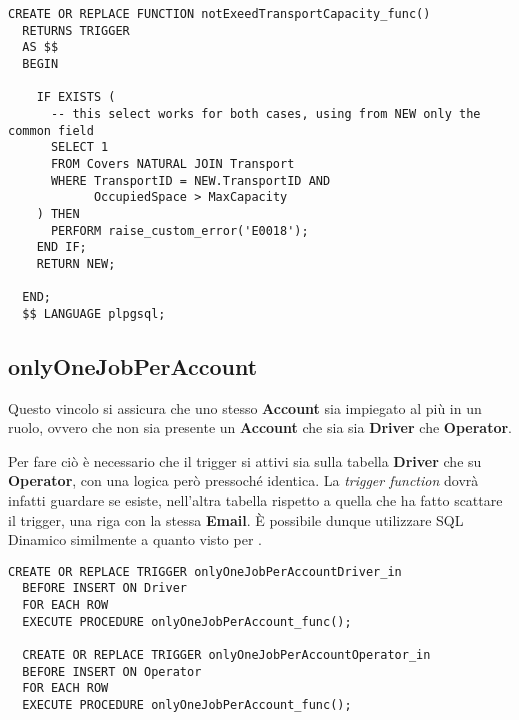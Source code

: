 \begin{lstlisting}[caption={Funzione per il vincolo \textbf{checkTransportCapacity}}]
  CREATE OR REPLACE FUNCTION notExeedTransportCapacity_func()
  RETURNS TRIGGER
  AS $$
  BEGIN
     
    IF EXISTS (
      -- this select works for both cases, using from NEW only the common field
      SELECT 1
      FROM Covers NATURAL JOIN Transport
      WHERE TransportID = NEW.TransportID AND
            OccupiedSpace > MaxCapacity
    ) THEN
      PERFORM raise_custom_error('E0018');
    END IF;
    RETURN NEW;

  END;
  $$ LANGUAGE plpgsql;
\end{lstlisting}

\newpage

\subsection{\textbf{onlyOneJobPerAccount}}

Questo vincolo si assicura che uno stesso \textbf{Account} sia impiegato al più in un ruolo, ovvero che non sia presente un \textbf{Account} che sia sia \textbf{Driver} che \textbf{Operator}.

Per fare ciò è necessario che il trigger si attivi sia sulla tabella \textbf{Driver} che su \textbf{Operator}, con una logica però pressoché identica. La \textit{trigger function} dovrà infatti guardare se esiste, nell'altra tabella rispetto a quella che ha fatto scattare il trigger, una riga con la stessa \textbf{Email}.
È possibile dunque utilizzare SQL Dinamico similmente a quanto visto per .

\begin{lstlisting}[caption={Trigger per il vincolo \textbf{onlyOneJobPerAccount}}]
  CREATE OR REPLACE TRIGGER onlyOneJobPerAccountDriver_in
  BEFORE INSERT ON Driver
  FOR EACH ROW
  EXECUTE PROCEDURE onlyOneJobPerAccount_func();

  CREATE OR REPLACE TRIGGER onlyOneJobPerAccountOperator_in
  BEFORE INSERT ON Operator
  FOR EACH ROW
  EXECUTE PROCEDURE onlyOneJobPerAccount_func();
\end{lstlisting}

